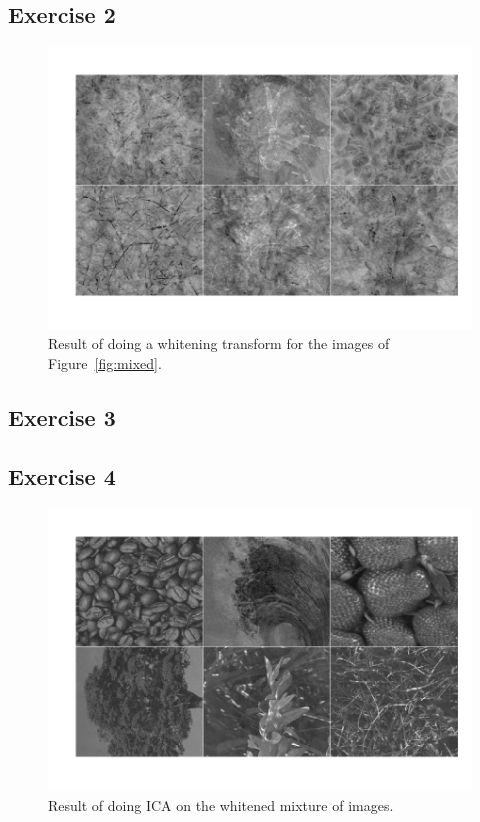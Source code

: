 \documentclass{article}
\begin{document}
\subsection{Exercise 2}

\begin{figure}\centering
	\includegraphics[scale=\iscale]{white}
	\caption{Result of doing a whitening transform for the images of Figure~\ref{fig:mixed}.}\label{fig:white}
\end{figure}

\subsection{Exercise 3}
\subsection{Exercise 4}

\begin{figure}\centering
	\includegraphics[scale=\iscale]{icares}
	\caption{Result of doing ICA on the whitened mixture of images.}\label{fig:icares}
\end{figure}
\end{document}
